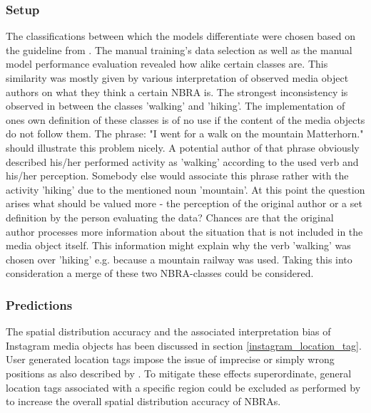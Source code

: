 \subsubsection*{Setup} 
The classifications between which the models differentiate were chosen based on the guideline from \textcite{IFL2018}. The manual training's data selection as well as the manual model performance evaluation revealed how alike certain classes are. This similarity was mostly given by various interpretation of observed media object authors on what they think a certain NBRA is. The strongest inconsistency is observed in between the classes 'walking' and 'hiking'. The implementation of ones own definition of these classes is of no use if the content of the media objects do not follow them. The phrase: "I went for a walk on the mountain Matterhorn." should illustrate this problem nicely. A potential author of that phrase obviously described his/her performed activity as 'walking' according to the used verb and his/her perception. Somebody else would associate this phrase rather with the activity 'hiking' due to the mentioned noun 'mountain'. At this point the question arises what should be valued more - the perception of the original author or a set definition by the person evaluating the data? Chances are that the original author processes more information about the situation that is not included in the media object itself. This information might explain why the verb 'walking' was chosen over 'hiking' e.g. because a mountain railway was used. 
Taking this into consideration a merge of these two NBRA-classes could be considered.

\subsubsection*{Predictions}
The spatial distribution accuracy and the associated interpretation bias of Instagram media objects has been discussed in section \ref{instagram_location_tag}. User generated location tags impose the issue of imprecise or simply wrong positions as also described by \textcite{Lee2016}. To mitigate these effects superordinate, general location tags associated with a specific region could be excluded as performed by \textcite{Heikinheimo2017} to increase the overall spatial distribution accuracy of NBRAs.

